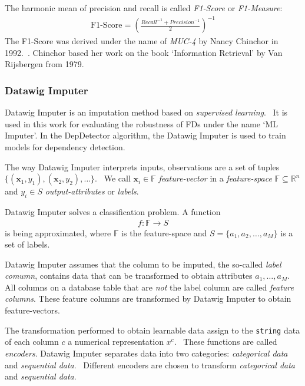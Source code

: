 The harmonic mean of precision and recall is called \emph{F1-Score} or \emph{F1-Measure}:
\begin{align}\label{eq:f1-score}
\text{F1-Score} = {\left(\frac{Recall^{-1} + Precision^{-1}}{2}\right)}^{-1}
\end{align}
The F1-Score was derived under the name of \emph{MUC-4} by Nancy Chinchor in 1992.~\cite{CHI92}.
Chinchor based her work on the book `Information Retrieval' by Van Rijsbergen from 1979.~\cite{RIJ79}

\subsubsection{Datawig Imputer}
Datawig Imputer is an imputation method based on \emph{supervised learning}.~\cite[p.~1]{BIE18}
It is used in this work for evaluating the robustness of FDs under the name `ML Imputer'.
In the DepDetector algorithm, the Datawig Imputer is used to train models for dependency detection.

The way Datawig Imputer interprets inputs, observations are a set of tuples \( \{\left(\mathbold{x}_1, y_1\right),\left(\mathbold{x}_2, y_2\right), \dots \} \).~\cite[p.~10]{SMO08}
We call \( \mathbold{x}_i \in \mathbb{F}\) \emph{feature-vector} in a \emph{feature-space} \( \mathbb{F} \subseteq \mathbb{R}^{n} \) and \( y_i \in S \) \emph{output-attributes} or \emph{labels}.~\cite[p.~7]{DUD00}

Datawig Imputer solves a classification problem.
A function
\begin{align*}
    f: \mathbb{F} \rightarrow S
\end{align*}
is being approximated, where \( \mathbb{F} \) is the feature-space and \( S = \{a_1, a_2, \dots, a_M \} \) is a set of labels.

Datawig Imputer assumes that the column to be imputed, the so-called \emph{label comumn}, contains data that can be transformed to obtain attributes \( a_1, \dots, a_M \).~\cite[p.~2018]{BIE18}
All columns on a database table that are \emph{not} the label column are called \emph{feature columns}.
These feature columns are transformed by Datawig Imputer to obtain feature-vectors.

The transformation performed to obtain learnable data assign to the \texttt{string} data of each column \( c \) a numerical representation \( x^c \).~\cite[p.~2020]{BIE18}
These functions are called \emph{encoders}.
Datawig Imputer separates data into two categories: \emph{categorical data} and \emph{sequential data}.~\cite[p.~2017]{BIE18}
Different encoders are chosen to transform \emph{categorical data} and \emph{sequential data}.

